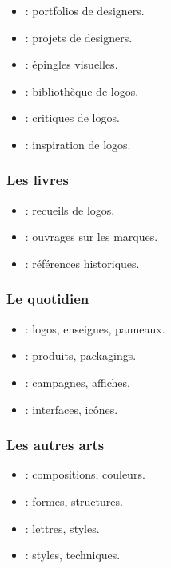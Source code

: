 \begin{itemize}
    \item {} : portfolios de designers.
    \item {} : projets de designers.
    \item {} : épingles visuelles.
    \item {} : bibliothèque de logos.
    \item {} : critiques de logos.
    \item {} : inspiration de logos.
\end{itemize}

\subsubsection{Les livres}

\begin{itemize}
    \item {} : recueils de logos.
    \item {} : ouvrages sur les marques.
    \item {} : références historiques.
\end{itemize}

\subsubsection{Le quotidien}

\begin{itemize}
    \item {} : logos, enseignes, panneaux.
    \item {} : produits, packagings.
    \item {} : campagnes, affiches.
    \item {} : interfaces, icônes.
\end{itemize}

\subsubsection{Les autres arts}

\begin{itemize}
    \item {} : compositions, couleurs.
    \item {} : formes, structures.
    \item {} : lettres, styles.
    \item {} : styles, techniques.
\end{itemize}


